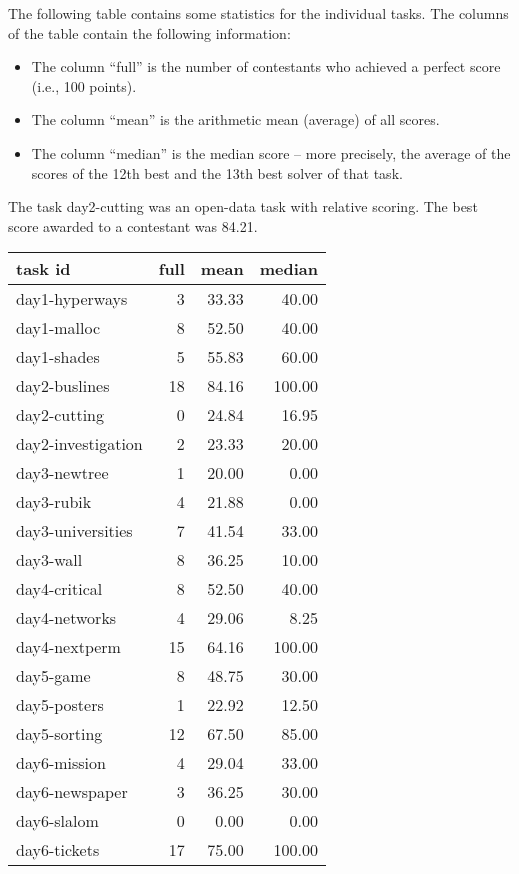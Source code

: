 
The following table contains some statistics for the individual tasks. 
The columns of the table contain the following information:

\begin{itemize}
\item The column ``full'' is the number of contestants who achieved a perfect score (i.e., 100 points).
\item The column ``mean'' is the arithmetic mean (average) of all scores.
\item The column ``median'' is the median score -- more precisely, the average of the scores of the 12th best 
and the 13th best solver of that task.
\end{itemize}

The task day2-cutting was an open-data task with relative scoring. The best score awarded to a contestant was 84.21.
\bigskip

\begin{center}
\begin{tabular}{l|rrr}
task id & full & mean & median  \\
\hline
day1-hyperways     &  3 & 33.33 &  40.00 \\
day1-malloc        &  8 & 52.50 &  40.00 \\
day1-shades        &  5 & 55.83 &  60.00 \\
\hline
day2-buslines      & 18 & 84.16 & 100.00 \\
day2-cutting       &  0 & 24.84 &  16.95 \\
day2-investigation &  2 & 23.33 &  20.00 \\
\hline
day3-newtree       &  1 & 20.00 &   0.00 \\
day3-rubik         &  4 & 21.88 &   0.00 \\
day3-universities  &  7 & 41.54 &  33.00 \\
day3-wall          &  8 & 36.25 &  10.00 \\
\hline
day4-critical      &  8 & 52.50 &  40.00 \\
day4-networks      &  4 & 29.06 &   8.25 \\
day4-nextperm      & 15 & 64.16 & 100.00 \\
\hline
day5-game          &  8 & 48.75 &  30.00 \\
day5-posters       &  1 & 22.92 &  12.50 \\
day5-sorting       & 12 & 67.50 &  85.00 \\
\hline
day6-mission       &  4 & 29.04 &  33.00 \\
day6-newspaper     &  3 & 36.25 &  30.00 \\
day6-slalom        &  0 &  0.00 &   0.00 \\
day6-tickets       & 17 & 75.00 & 100.00 \\
\end{tabular}
\end{center}

